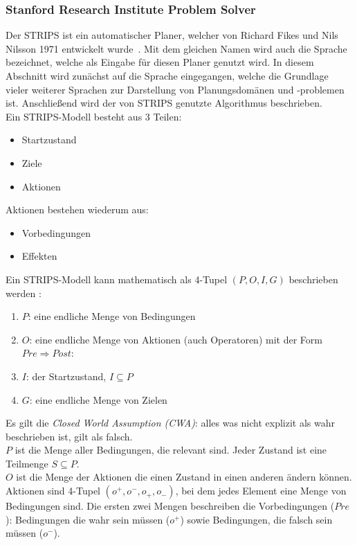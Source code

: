 \subsubsection{Stanford Research Institute Problem Solver}{\label{chap:strips}}
Der \ac{STRIPS} ist ein automatischer Planer, welcher von Richard Fikes und Nils Nilsson 1971 entwickelt wurde~\cite{FIKES1971189}.
Mit dem gleichen Namen wird auch die Sprache bezeichnet, welche als Eingabe für diesen Planer genutzt wird.
In diesem Abschnitt wird zunächst auf die Sprache eingegangen, welche die Grundlage vieler weiterer Sprachen zur Darstellung von Planungsdomänen und -problemen ist.
Anschließend wird der von \ac{STRIPS} genutzte Algorithmus beschrieben.\\
Ein \ac{STRIPS}-Modell besteht aus 3 Teilen:
\begin{itemize}
    \item Startzustand
    \item Ziele
    \item Aktionen
\end{itemize}
Aktionen bestehen wiederum aus:
\begin{itemize}
    \item Vorbedingungen
    \item Effekten
\end{itemize}
Ein \ac{STRIPS}-Modell kann mathematisch als 4-Tupel \((P,O,I,G)\) beschrieben werden \cite{stripsdef}:
\begin{enumerate}
    \item \(P\): eine endliche Menge von Bedingungen
    \item \(O\): eine endliche Menge von Aktionen (auch Operatoren) mit der Form $Pre \Rightarrow Post$:
    \item \(I\): der Startzustand, $I\subseteq P$
    \item \(G\): eine endliche Menge von Zielen
\end{enumerate}
Es gilt die \emph{Closed World Assumption (CWA)}: alles was nicht explizit als wahr beschrieben ist, gilt als falsch.\\
$P$ ist die Menge aller Bedingungen, die relevant sind.
Jeder Zustand ist eine Teilmenge $S\subseteq P$.\\
$O$ ist die Menge der Aktionen die einen Zustand in einen anderen ändern können.
Aktionen sind 4-Tupel \((o^+,o^-,o_+,o_-)\), bei dem jedes Element eine Menge von Bedingungen sind.
Die ersten zwei Mengen beschreiben die Vorbedingungen ($Pre$): Bedingungen die wahr sein müssen ($o^+$) sowie Bedingungen, die falsch sein müssen ($o^-$).

